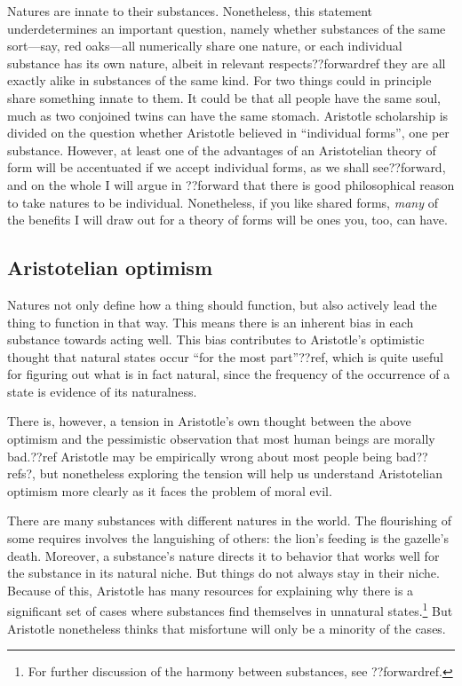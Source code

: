 Natures are innate to their substances. Nonetheless, this statement underdetermines an important question, namely whether 
substances of the same sort---say, red oaks---all numerically share one nature, or each individual substance has its own nature, 
albeit in relevant respects??forwardref they are all exactly alike in substances of the same kind. For two things could in
principle share something innate to them. It could be that all people have the same soul, much as two conjoined twins can
have the same stomach. Aristotle scholarship is divided on the question whether Aristotle believed in ``individual forms'',
one per substance. However, at least one of the advantages of an Aristotelian theory of form will be accentuated if we accept 
individual forms, as we shall see??forward, and on the whole I will argue in ??forward that there is good
philosophical reason to take natures to be individual.
Nonetheless, if you like shared forms, 
\textit{many} of the benefits I will draw out for a theory of forms will be ones you, too, can have. 

\subsection{Aristotelian optimism}
Natures not only define how a thing should function, but also actively lead the thing to function in that way.
This means there is an inherent bias in each substance towards acting well. This bias contributes to Aristotle's
optimistic thought that natural states occur ``for the most part''??ref, which is quite useful for figuring out
what is in fact natural, since the frequency of the occurrence of a state is evidence of its naturalness.

There is, however, a tension in Aristotle's own thought between the above optimism and the pessimistic observation 
that most human beings are morally bad.??ref Aristotle may be empirically wrong about most people being bad??refs?,
but nonetheless exploring the tension will help us understand Aristotelian optimism more clearly as it faces the
problem of moral evil.

There are many substances with different natures in the world. The flourishing of some requires involves the languishing
of others: the lion's feeding is the gazelle's death. Moreover, a substance's nature directs it to behavior that works
well for the substance in its natural niche. But things do not always stay in their niche. Because of this, Aristotle
has many resources for explaining why there is a significant set of cases where substances find themselves in unnatural
states.\footnote{For further discussion of the harmony between substances, see ??forwardref.} But Aristotle nonetheless
thinks that misfortune will only be a minority of the cases.

